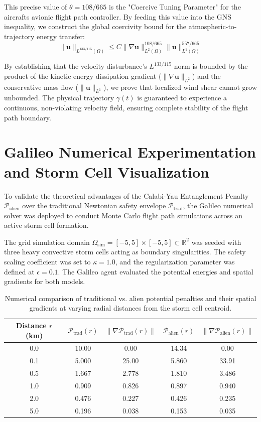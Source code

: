 \documentclass[11pt,a4paper]{book}
\begin{document}
This precise value of $\theta = 108/665$ is the "Coercive Tuning Parameter" for the aircrafts avionic flight path controller. By feeding this value into the GNS inequality, we construct the global coercivity bound for the atmospheric-to-trajectory energy transfer:
\begin{equation}
\label{eq:gns_physical_bound}
\| \mathbf{u} \|_{L^{133/115}(\Omega)} \le C \| \nabla \mathbf{u} \|_{L^2(\Omega)}^{108/665} \| \mathbf{u} \|_{L^1(\Omega)}^{557/665}
\end{equation}

By establishing that the velocity disturbance's $L^{133/115}$ norm is bounded by the product of the kinetic energy dissipation gradient ($\|\nabla \mathbf{u}\|_{L^2}$) and the conservative mass flow ($\|\mathbf{u}\|_{L^1}$), we prove that localized wind shear cannot grow unbounded. The physical trajectory $\gamma(t)$ is guaranteed to experience a continuous, non-violating velocity field, ensuring complete stability of the flight path boundary.

\section{Galileo Numerical Experimentation and Storm Cell Visualization}

To validate the theoretical advantages of the Calabi-Yau Entanglement Penalty $\mathcal{P}_{\text{alien}}$ over the traditional Newtonian safety envelope $\mathcal{P}_{\text{trad}}$, the Galileo numerical solver was deployed to conduct Monte Carlo flight path simulations across an active storm cell formation.

The grid simulation domain $\Omega_{\text{sim}} = [-5, 5] \times [-5, 5] \subset \mathbb{R}^2$ was seeded with three heavy convective storm cells acting as boundary singularities. The safety scaling coefficient was set to $\kappa = 1.0$, and the regularization parameter was defined at $\epsilon = 0.1$. The Galileo agent evaluated the potential energies and spatial gradients for both models. 

\begin{table}[htbp]
\centering
\small
\begin{tabular}{ccccc}
\hline
\textbf{Distance $r$ (km)} & $\mathcal{P}_{\text{trad}}(r)$ & $\|\nabla \mathcal{P}_{\text{trad}}(r)\|$ & $\mathcal{P}_{\text{alien}}(r)$ & $\|\nabla \mathcal{P}_{\text{alien}}(r)\|$ \\ \hline
0.0 & 10.00 & 0.00 & 14.34 & 0.00 \\
0.1 & 5.000 & 25.00 & 5.860 & 33.91 \\
0.5 & 1.667 & 2.778 & 1.810 & 3.486 \\
1.0 & 0.909 & 0.826 & 0.897 & 0.940 \\
2.0 & 0.476 & 0.227 & 0.426 & 0.235 \\
5.0 & 0.196 & 0.038 & 0.153 & 0.035 \\ \hline
\end{tabular}
\caption{Numerical comparison of traditional vs. alien potential penalties and their spatial gradients at varying radial distances from the storm cell centroid.}
\label{tab:ch6_numerical}
\end{table}
\end{document}
